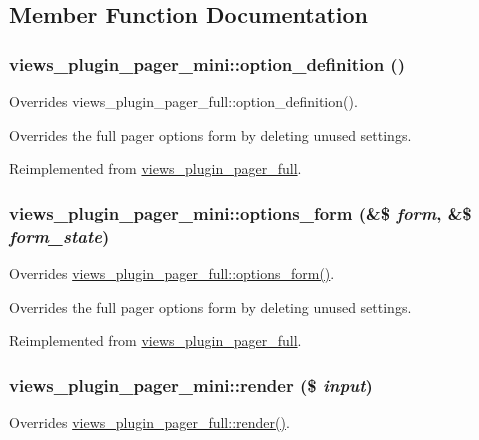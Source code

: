 \subsection{Member Function Documentation}
\hypertarget{classviews__plugin__pager__mini_a35f1785b28b6ddf55a96c8bf0f43a4ad}{
\subsubsection[{option\_\-definition}]{\setlength{\rightskip}{0pt plus 5cm}views\_\-plugin\_\-pager\_\-mini::option\_\-definition ()}}
\label{classviews__plugin__pager__mini_a35f1785b28b6ddf55a96c8bf0f43a4ad}
Overrides views\_\-plugin\_\-pager\_\-full::option\_\-definition().

Overrides the full pager options form by deleting unused settings. 

Reimplemented from \hyperlink{classviews__plugin__pager__full}{views\_\-plugin\_\-pager\_\-full}.\hypertarget{classviews__plugin__pager__mini_adfab7244c29b6398132916429741bc1f}{
\subsubsection[{options\_\-form}]{\setlength{\rightskip}{0pt plus 5cm}views\_\-plugin\_\-pager\_\-mini::options\_\-form (\&\$ {\em form}, \/  \&\$ {\em form\_\-state})}}
\label{classviews__plugin__pager__mini_adfab7244c29b6398132916429741bc1f}
Overrides \hyperlink{classviews__plugin__pager__full_a4f3bcc9bc5ab8ddbbcacdce3108dcfd7}{views\_\-plugin\_\-pager\_\-full::options\_\-form()}.

Overrides the full pager options form by deleting unused settings. 

Reimplemented from \hyperlink{classviews__plugin__pager__full_a4f3bcc9bc5ab8ddbbcacdce3108dcfd7}{views\_\-plugin\_\-pager\_\-full}.\hypertarget{classviews__plugin__pager__mini_a71a931670147e0b4356b3a0133104933}{
\subsubsection[{render}]{\setlength{\rightskip}{0pt plus 5cm}views\_\-plugin\_\-pager\_\-mini::render (\$ {\em input})}}
\label{classviews__plugin__pager__mini_a71a931670147e0b4356b3a0133104933}
Overrides \hyperlink{classviews__plugin__pager__full_a1832939d6ea8c80e643cb94bae96daf8}{views\_\-plugin\_\-pager\_\-full::render()}.

